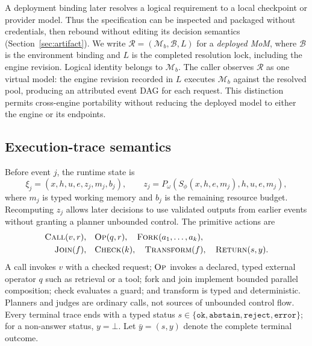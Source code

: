 A deployment binding later resolves a logical requirement to a local checkpoint
or provider model. Thus the specification can be inspected and packaged without
credentials, then rebound without editing its decision semantics
(Section~\ref{sec:artifact}). We write
$\mathcal{R}=(\mathcal{M}_b,\mathcal{B},L)$ for a \emph{deployed MoM}, where
$\mathcal{B}$ is the environment binding and $L$ is the completed resolution
lock, including the engine revision. Logical identity belongs to $\mathcal{M}_b$.
The caller observes $\mathcal{R}$ as one virtual model: the engine revision
recorded in $L$ executes $\mathcal{M}_b$ against the resolved pool, producing an
attributed event DAG for each request. This distinction permits cross-engine
portability without reducing the deployed model to either the engine or its
endpoints.

\subsection{Execution-trace semantics}

Before event $j$, the runtime state is
\begin{equation}
  \xi_j=(x,h,u,e,z_j,m_j,b_j), \qquad
  z_j=P_{\omega}(S_{\phi}(x,h,e,m_j),h,u,e,m_j),
\end{equation}
where $m_j$ is typed working memory and $b_j$ is the remaining resource budget.
Recomputing $z_j$ allows later decisions to use validated outputs from earlier
events without granting a planner unbounded control.
The primitive actions are
\begin{equation}
\begin{split}
  \textsc{Call}(v,r),\quad &\textsc{Op}(q,r),\quad
  \textsc{Fork}(a_1,\ldots,a_k),\\
  \textsc{Join}(f),\quad &\textsc{Check}(k),\quad
  \textsc{Transform}(f),\quad
  \textsc{Return}(s,y).
\end{split}
\label{eq:actions}
\end{equation}
A call invokes $v$ with a checked request; $\textsc{Op}$ invokes a declared,
typed external operator $q$ such as retrieval or a tool; fork and join implement
bounded parallel composition; check evaluates a guard; and transform is typed
and deterministic.  Planners and judges are ordinary calls, not sources of
unbounded control flow. Every terminal trace ends with a typed status
$s\in\{\texttt{ok},\texttt{abstain},\texttt{reject},\texttt{error}\}$; for a
non-answer status, $y=\bot$. Let $\bar y=(s,y)$ denote the complete terminal
outcome.


